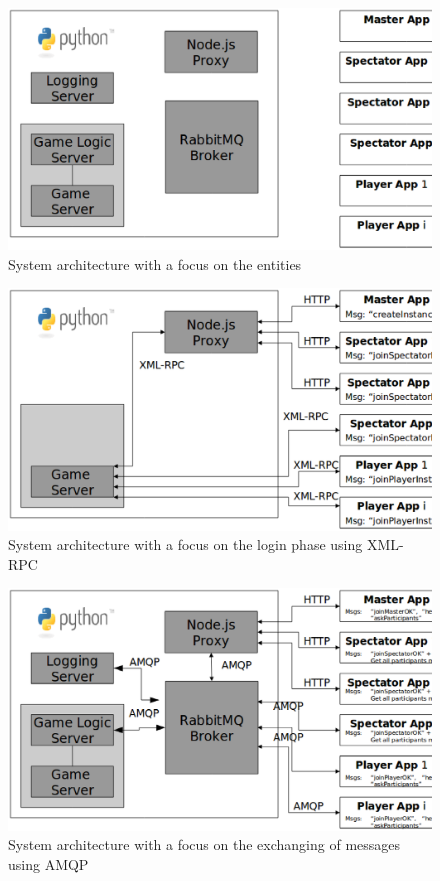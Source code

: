 \begin{figure}[htbp!]
\begin{center}
\includegraphics[scale=0.6]{Figures/_entities}
\caption{System architecture with a focus on the entities}
\label{F_entities}
\end{center}
\end{figure}


\begin{figure}[htbp!]
\begin{center}
\includegraphics[scale=0.6]{Figures/_step1_xmlrpc}
\caption{System architecture with a focus on the login phase using XML-RPC}
\label{F_step1_xmlrpc}
\end{center}
\end{figure}


\begin{figure}[htbp!]
\begin{center}
\includegraphics[scale=0.6]{Figures/_step2_amqp}
\caption{System architecture with a focus on the exchanging of messages using 
AMQP}
\label{F_step2_amqp}
\end{center}
\end{figure}

\endinput
